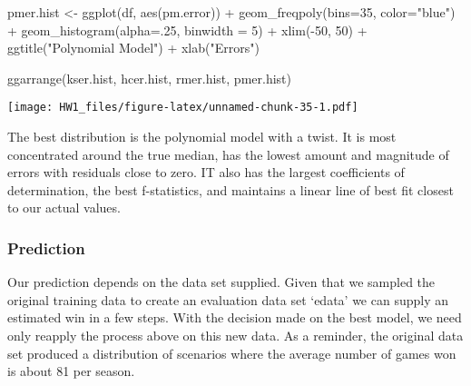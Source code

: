 \documentclass[
]{article}
\newenvironment{Shaded}{\begin{snugshade}}{\end{snugshade}}
\newcommand{\AttributeTok}[1]{\textcolor[rgb]{0.77,0.63,0.00}{#1}}
\newcommand{\DecValTok}[1]{\textcolor[rgb]{0.00,0.00,0.81}{#1}}
\newcommand{\FunctionTok}[1]{\textcolor[rgb]{0.00,0.00,0.00}{#1}}
\newcommand{\NormalTok}[1]{#1}
\newcommand{\OtherTok}[1]{\textcolor[rgb]{0.56,0.35,0.01}{#1}}
\newcommand{\SpecialCharTok}[1]{\textcolor[rgb]{0.00,0.00,0.00}{#1}}
\newcommand{\StringTok}[1]{\textcolor[rgb]{0.31,0.60,0.02}{#1}}
\begin{document}
\begin{Shaded}
\begin{Highlighting}[]
\NormalTok{pmer.hist }\OtherTok{\textless{}{-}} \FunctionTok{ggplot}\NormalTok{(df, }\FunctionTok{aes}\NormalTok{(pm.error)) }\SpecialCharTok{+} 
  \FunctionTok{geom\_freqpoly}\NormalTok{(}\AttributeTok{bins=}\DecValTok{35}\NormalTok{, }\AttributeTok{color=}\StringTok{"blue"}\NormalTok{) }\SpecialCharTok{+} 
  \FunctionTok{geom\_histogram}\NormalTok{(}\AttributeTok{alpha=}\NormalTok{.}\DecValTok{25}\NormalTok{, }\AttributeTok{binwidth =} \DecValTok{5}\NormalTok{) }\SpecialCharTok{+}
  \FunctionTok{xlim}\NormalTok{(}\SpecialCharTok{{-}}\DecValTok{50}\NormalTok{, }\DecValTok{50}\NormalTok{) }\SpecialCharTok{+} 
  \FunctionTok{ggtitle}\NormalTok{(}\StringTok{"Polynomial Model"}\NormalTok{) }\SpecialCharTok{+} 
  \FunctionTok{xlab}\NormalTok{(}\StringTok{"Errors"}\NormalTok{)}

\FunctionTok{ggarrange}\NormalTok{(kser.hist, hcer.hist, rmer.hist, pmer.hist)}
\end{Highlighting}
\end{Shaded}

\texttt{[image: HW1\_files/figure-latex/unnamed-chunk-35-1.pdf]}

The best distribution is the polynomial model with a twist. It is most
concentrated around the true median, has the lowest amount and magnitude
of errors with residuals close to zero. IT also has the largest
coefficients of determination, the best f-statistics, and maintains a
linear line of best fit closest to our actual values.

\hypertarget{prediction}{%
\subsubsection{Prediction}\label{prediction}}

Our prediction depends on the data set supplied. Given that we sampled
the original training data to create an evaluation data set `edata' we
can supply an estimated win in a few steps. With the decision made on
the best model, we need only reapply the process above on this new data.
As a reminder, the original data set produced a distribution of
scenarios where the average number of games won is about 81 per season.
\end{document}

